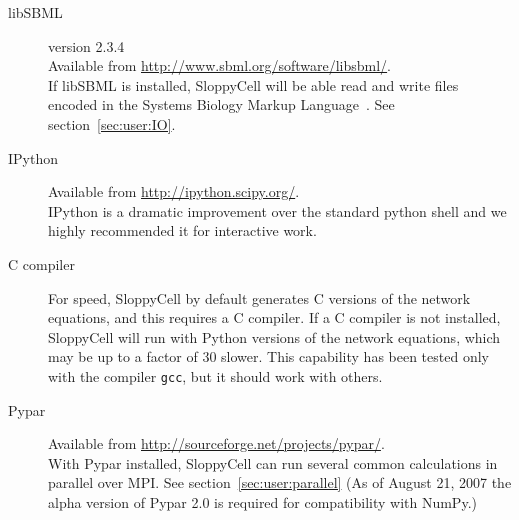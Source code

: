 \documentclass[12pt]{article}
\newcommand{\filename}[1]{\texttt{#1}}
\begin{document}
\begin{description}

\item[libSBML] version 2.3.4\\
Available from \url{http://www.sbml.org/software/libsbml/}.\\
If libSBML is installed, SloppyCell will be able read and write files encoded in the Systems Biology Markup Language~\cite{bib:Hucka2003}. See section~\ref{sec:user:IO}.

\item[IPython]
Available from \url{http://ipython.scipy.org/}.\\
IPython is a dramatic improvement over the standard python shell and we highly recommended it for interactive work.

\item[C compiler]
For speed, SloppyCell by default generates C versions of the network equations, and this requires a C compiler. 
If a C compiler is not installed, SloppyCell will run with Python versions of the network equations, which may be up to a factor of 30 slower. 
This capability has been tested only with the compiler \filename{gcc}, but it should work with others.

\item[Pypar]
Available from \url{http://sourceforge.net/projects/pypar/}.\\
With Pypar installed, SloppyCell can run several common calculations in parallel over MPI. See section~\ref{sec:user:parallel}
(As of August 21, 2007 the alpha version of Pypar 2.0 is required for compatibility with NumPy.)


\end{description}
\end{document}
